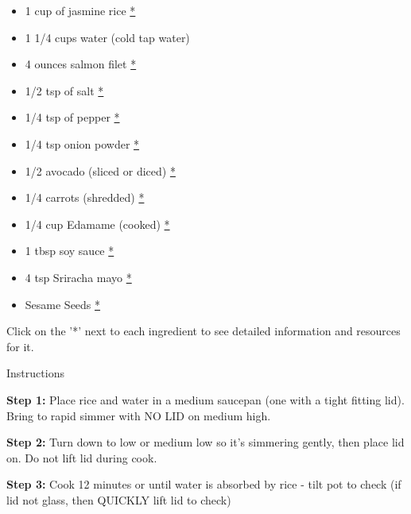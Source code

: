 \documentclass[
]{book}
\providecommand{\tightlist}{%
  \setlength{\itemsep}{0pt}\setlength{\parskip}{0pt}}
\begin{document}
\begin{itemize}
\tightlist
\item
  1 cup of jasmine rice
  \href{https://www.publix.com/pd/publix-rice-jasmine/RIO-PCI-142398?origin=search1}{*}
\item
  1 1/4 cups water (cold tap water)
\item
  4 ounces salmon filet
  \href{https://www.publix.com/pd/salmon-select-cuts-fresh-responsibly-sourced-farmed/RIO-FNU-591951?origin=search2}{*}
\item
  1/2 tsp of salt
  \href{https://www.publix.com/pd/morton-salt/RIO-PCI-103677?origin=search9}{*}
\item
  1/4 tsp of pepper
  \href{https://www.publix.com/pd/publix-black-pepper-ground/RIO-PCI-110488?origin=search1}{*}
\item
  1/4 tsp onion powder
  \href{https://www.publix.com/pd/publix-onion-powder/RIO-PCI-111136?origin=search1}{*}
\item
  1/2 avocado (sliced or diced)
  \href{https://www.publix.com/pd/hass-avocados/RIO-PCI-107578?origin=search1}{*}
\item
  1/4 carrots (shredded)
  \href{https://www.publix.com/pd/greenwise-shredded-carrots-organic/RIO-PCI-107793?origin=search1}{*}
\item
  1/4 cup Edamame (cooked)
  \href{https://www.publix.com/pd/seapoint-farms-edamame/RIO-PCI-159631?origin=search1}{*}
\item
  1 tbsp soy sauce
  \href{https://www.publix.com/pd/publix-sauce-soy-less-sodium/RIO-PCI-125220?origin=search1}{*}
\item
  4 tsp Sriracha mayo
  \href{https://www.publix.com/pd/lee-kum-kee-dressingspread-mayo-sriracha/RIO-PCI-520244?origin=search4}{*}
\item
  Sesame Seeds
  \href{https://www.publix.com/pd/badia-sesame-seeds-tri-color-organic/RIO-PCI-543666?origin=search3}{*}
\end{itemize}

Click on the '*' next to each ingredient to see detailed information and
resources for it.

Instructions

\textbf{Step 1:} Place rice and water in a medium saucepan (one with a
tight fitting lid). Bring to rapid simmer with NO LID on medium high.

\textbf{Step 2:} Turn down to low or medium low so it's simmering
gently, then place lid on. Do not lift lid during cook.

\textbf{Step 3:} Cook 12 minutes or until water is absorbed by rice -
tilt pot to check (if lid not glass, then QUICKLY lift lid to check)
\end{document}
